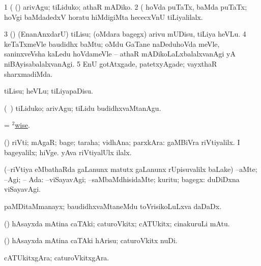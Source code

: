 \noindent 
\gl{\pagu}
\bmng
\bnum
\num{1}  (   (\AmA) arivAgu; tiLiduko; athaR mADiko. 
\num{2}  (      hoVda puTaTx, baMda puTaTx; hoVgi baMdadedxV horatu hiMdigiMta hececxVnU tiLiyalilalx. 
\num{3}  (\AmA) (EnanAnxdarU) tiLisu; (oMdara bagegx) arivu mUDisu, tiLiya heVLu. 
\num{4}  keTaTxmeVle baudidhx baMtu; oMdu GaTane naDeduhoVda meVle, saninxveVsha kaLedu hoVdameVle -- athaR mADikoLaLxbalalxvanAgi yA niBAyisabalalxvanAgi. 
\num{5}  EnU gotAtxgade, patetxyAgade; vayxthaR sharxmadiMda. 
\enum
\emng
\eentry

\bentry
{} 
\gl{\sakirx}
\bmng
tiLisu; heVLu; tiLiyapaDisu. 
\emng

\noindent
\gl{\akirx}
\bmng
(\kanmu\ \ame) tiLiduko; arivAgu; tiLidu budidhxvaMtanAgu. 
\emng

\noindent 
\gl{\pagu}
\bmng
{} = \hyperlink{wise(2)}{$^2$wise}. 
\emng
\eentry

\bentry
{} 
\gl{\nA}
\expl{}
\bmng
(\pArxparx) riVti; mAgaR; bage; taraha; vidhAna; parxkAra:  gaMBiVra riVtiyalilx.  I bageyalilx; hiVge.  yAva riVtiyalUlx ilalx. 
\emng
\eentry

\bentry
{}
\gl{\uparx}
\expl{}
\bmng
(--riVtiya eMbathaRda \gu gaLanunx matutx \kirxvi gaLanunx rUpisuvalilx baLake) 
\banum
{} --aMte; --Agi; -- Ada:  
 --viSayavAgi; --saMbaMdhisidaMte; kuritu; bagegx:  duDiDxna viSayavAgi. 
\eanum
\emng
\eentry

\bentry
{}
\gl{\nA}
\bmng
paMDitaMmanayx; baudidhxvaMtaneMdu toVrisikoLuLxva daDaDx. 
\emng
\eentry

\bentry
{}
\gl{\nA}
\bmng
(\AmA) hAsayxda mAtina caTAki; caturoVkitx; cATUkitx; cinakuruLi mAtu. 
\emng
\eentry

\bentry
{}
\gl{\akirx}
\bmng
(\AmA) hAsayxda mAtina caTAki hArisu; caturoVkitx nuDi. 
\emng
\eentry

\bentry
{}
\gl{\nA}
\bmng
cATUkitxgAra; caturoVkitxgAra. 
\emng
\eentry

